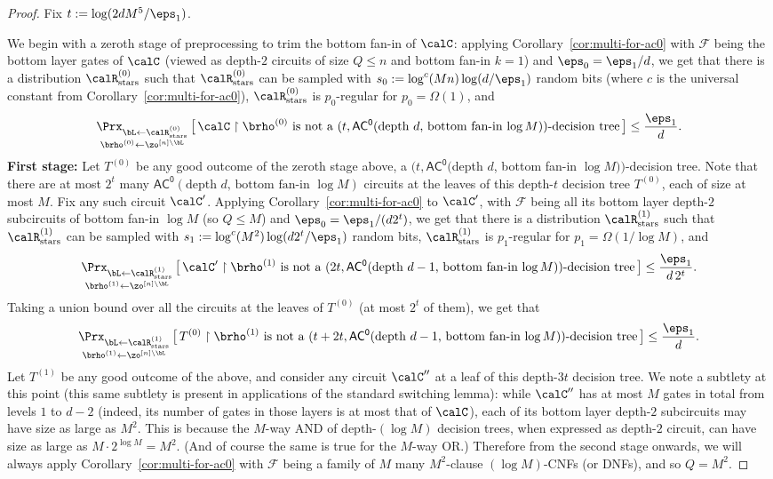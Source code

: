 \documentclass[11pt]{article}
\numberwithin{equation}{section}
\theoremstyle{definition}
\theoremstyle{plain}
\theoremstyle{plain}
\newcommand{\acz}{\mathsf{AC^0}}
\newcommand{\uhr}{\upharpoonright}
\newcommand{\stars}{\mathrm{stars}}
\begin{document}
\begin{proof} 
Fix $t := \log(2dM^5/\eps_1)$.  

\medskip 
{} We begin with a zeroth stage of preprocessing to trim the bottom fan-in of $\calC$: applying Corollary~\ref{cor:multi-for-ac0} with $\mathscr{F}$ being the bottom layer gates of $\calC$ (viewed as depth-$2$ circuits of size $Q \le n$ and bottom fan-in $k=1$) and $\eps_0 = \eps_1/d$, we get that there is a distribution $\calR_\stars^{(0)}$ such that $\calR_\stars^{(0)}$ can be sampled with $s_0 := \log^{c}(Mn)\log(d/\eps_1)$ random bits (where $c$ is the universal constant from Corollary~\ref{cor:multi-for-ac0}), $\calR_\stars^{(0)}$ is $p_0$-regular for $p_0 = \Omega(1)$,  and 
\[ \mathop{\Prx_{\bL\leftarrow\calR_\stars^{(0)}}}_{\brho^{(0)}\leftarrow\zo^{[n]\setminus \bL}}\big[\,\calC \uhr \brho^{(0)} \text{~is not a $(t, \acz(\text{depth $d$, bottom fan-in $\log M$}))$-decision tree}\, \big] \le \frac{\eps_1}{d}. \] 
{\bf First stage:} Let $T^{(0)}$ be any good outcome of the zeroth stage above, a $(t, \acz($depth $d$, bottom fan-in $\log M))$-decision tree. Note that there are at most $2^t$ many $\acz(\text{depth $d$, bottom fan-in $\log M$})$ circuits at the leaves of this depth-$t$ decision tree $T^{(0)}$, each of size at most $M$. Fix any such circuit $\calC'$. Applying Corollary~\ref{cor:multi-for-ac0} to $\calC'$, with $\mathscr{F}$ being all its bottom layer depth-$2$ subcircuits of bottom fan-in $\log M$ (so $Q \le M$) and $\eps_0 = \eps_1/(d2^t)$, we get that there is a distribution $\calR_\stars^{(1)}$ such that $\calR_\stars^{(1)}$ can be sampled with $s_1 := \log^{c}(M^2) \log(d2^t/\eps_1)$  random bits, $\calR_\stars^{(1)}$ is $p_1$-regular for $p_1 = \Omega(1/\log M)$, and  
\[ \mathop{\Prx_{\bL\leftarrow\calR_\stars^{(1)}}}_{\brho^{(1)}\leftarrow\zo^{[n]\setminus \bL}}\big[\,\calC' \uhr \brho^{(1)} \text{~is not a $(2t, \acz(\text{depth $d-1$, bottom fan-in $\log M$}))$-decision tree}\, \big] \le \frac{\eps_1}{d\,2^t}. \] 
Taking a union bound over all the circuits at the leaves of $T^{(0)}$ (at most $2^t$ of them), we get that 
\[ \mathop{\Prx_{\bL\leftarrow\calR_\stars^{(1)}}}_{\brho^{(1)}\leftarrow\zo^{[n]\setminus \bL}}\big[\,T^{(0)} \uhr \brho^{(1)} \text{~is not a $(t+2t, \acz(\text{depth $d-1$, bottom fan-in $\log M$}))$-decision tree}\, \big] \le \frac{\eps_1}{d}. \] 
Let $T^{(1)}$ be any good outcome of the above, and consider any circuit $\calC''$ at a leaf of this depth-$3t$ decision tree. We note a subtlety at this point (this same subtlety is present in applications of the standard switching lemma): while $\calC''$ has at most $M$ gates in total from levels $1$ to $d-2$ (indeed, its number of gates in those layers is at most that of $\calC$), each of its bottom layer depth-$2$ subcircuits may have size as large as $M^2$. This is because the $M$-way AND of depth-$(\log M)$ decision trees, when expressed as depth-$2$ circuit, can have size as large as $M \cdot 2^{\log M} = M^2$. (And of course the same is true for the $M$-way OR.) Therefore from the second stage onwards, we will always apply Corollary~\ref{cor:multi-for-ac0} with $\mathscr{F}$ being a family of $M$ many $M^2$-clause $(\log M)$-CNFs (or DNFs), and so $Q = M^2$. \smallskip


\end{proof}
\end{document}
